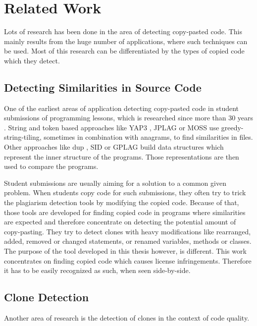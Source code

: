 
\chapter{Related Work}\label{chapter:related_work}
Lots of research has been done in the area of detecting copy-pasted code.
This mainly results from the huge number of applications, where such techniques can be used.
Most of this research can be differentiated by the types of copied code which they detect.

\section{Detecting Similarities in Source Code}\label{section:related_work/detecting_similarities}
One of the earliest areas of application detecting copy-pasted code in student submissions of programming lessons, which is researched since more than 30 years \cite{lancaster2004comparison}.
String and token based approaches like YAP3 \cite{wise1996yap3}, JPLAG \cite{prechelt2002finding} or MOSS \cite{schleimer2003winnowing} use greedy-string-tiling, sometimes in combination with anagrams, to find similarities in files.
Other approaches like dup \cite{baker1995finding}, SID \cite{chen2004shared} or GPLAG \cite{liu2006gplag} build data structures which represent the inner structure of the programs.
Those representations are then used to compare the programs.

Student submissions are usually aiming for a solution to a common given problem.
When students copy code for such submissions, they often try to trick the plagiarism detection tools by modifying the copied code.
Because of that, those tools are developed for finding copied code in programs where similarities are expected and therefore concentrate on detecting the potential amount of copy-pasting.
They try to detect clones with heavy modifications like rearranged, added, removed or changed statements, or renamed variables, methods or classes.
The purpose of the tool developed in this thesis however, is different.
This work concentrates on finding copied code which causes license infringements.
Therefore it has to be easily recognized as such, when seen side-by-side.

\section{Clone Detection}\label{section:related_work/clone_detection}
Another area of research is the detection of clones in the context of code quality.

